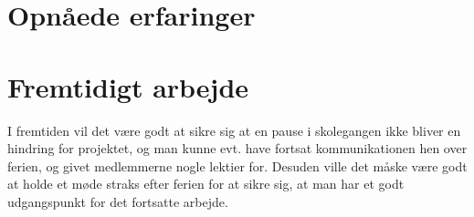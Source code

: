 \section{Opnåede erfaringer}

\section{Fremtidigt arbejde}
I fremtiden vil det være godt at sikre sig at en pause i skolegangen ikke bliver en hindring for projektet, og man kunne evt. have fortsat kommunikationen hen over ferien, og givet medlemmerne nogle lektier for. Desuden ville det måske være godt at holde et møde straks efter ferien for at sikre sig, at man har et godt udgangspunkt for det fortsatte arbejde.  